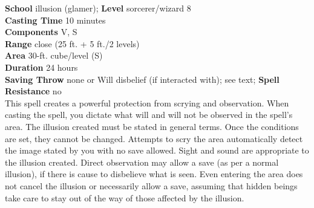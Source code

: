 \textbf{School} illusion (glamer); \textbf{Level} sorcerer/wizard 8\\
\textbf{Casting Time} 10 minutes\\
\textbf{Components} V, S\\
\textbf{Range} close (25 ft. + 5 ft./2 levels)\\
\textbf{Area} 30-ft. cube/level (S)\\
\textbf{Duration} 24 hours\\
\textbf{Saving Throw} none or Will disbelief (if interacted with); see text; \textbf{Spell Resistance} no\\
This spell creates a powerful protection from scrying and observation. When casting the spell, you dictate what will and will not be observed in the spell's area. The illusion created must be stated in general terms. Once the conditions are set, they cannot be changed. Attempts to scry the area automatically detect the image stated by you with no save allowed. Sight and sound are appropriate to the illusion created. Direct observation may allow a save (as per a normal illusion), if there is cause to disbelieve what is seen. Even entering the area does not cancel the illusion or necessarily allow a save, assuming that hidden beings take care to stay out of the way of those affected by the illusion.\\
